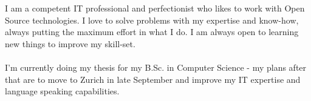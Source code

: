I am a competent IT professional and perfectionist who likes to work with Open Source technologies.
I love to solve problems with my expertise and know-how, always putting the maximum effort in what I do.
I am always open to learning new things to improve my skill-set.\\
\\
I'm currently doing my thesis for my B.Sc. in Computer Science - my plans after that are
to move to Zurich in late September and improve my IT expertise and language speaking capabilities.
